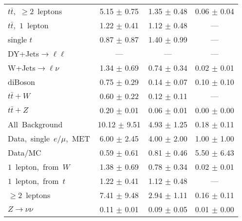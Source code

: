 \documentclass{article}
\begin{document}
\begin{longtable}{|l|c|c|c|}
$t\bar{t}$,~$\ge2$~leptons & 5.15 $\pm$ 0.75  & 1.35 $\pm$ 0.48  & 0.06 $\pm$ 0.04 \\* 
$t\bar{t}$,~$1$~lepton & 1.22 $\pm$ 0.41  & 1.12 $\pm$ 0.48  & --- \\* 
single $t$  & 0.87 $\pm$ 0.87  & 1.40 $\pm$ 0.99  & --- \\* 
DY+Jets$\rightarrow\ell\ell$  & ---  & ---  & --- \\* 
W+Jets$\rightarrow\ell\nu$  & 1.34 $\pm$ 0.69  & 0.74 $\pm$ 0.34  & 0.02 $\pm$ 0.01 \\* 
diBoson  & 0.75 $\pm$ 0.29  & 0.14 $\pm$ 0.07  & 0.10 $\pm$ 0.10 \\* 
$t\bar{t}+W$  & 0.60 $\pm$ 0.22  & 0.12 $\pm$ 0.11  & --- \\* 
$t\bar{t}+Z$  & 0.20 $\pm$ 0.01  & 0.06 $\pm$ 0.01  & 0.00 $\pm$ 0.00 \\* 
\hline \hline 
All~Background  & 10.12 $\pm$ 9.51  & 4.93 $\pm$ 1.25  & 0.18 $\pm$ 0.11 \\* 
Data,~single~$e/\mu$,~MET  & 6.00 $\pm$ 2.45  & 4.00 $\pm$ 2.00  & 1.00 $\pm$ 1.00 \\* 
Data/MC  & 0.59 $\pm$ 0.61  & 0.81 $\pm$ 0.46  & 5.50 $\pm$ 6.43 \\* 
\hline \hline 
$1$~lepton,~from~$W$  & 1.38 $\pm$ 0.69  & 0.78 $\pm$ 0.34  & 0.02 $\pm$ 0.01 \\* 
$1$~lepton,~from~$t$  & 1.22 $\pm$ 0.41  & 1.12 $\pm$ 0.48  & --- \\* 
$\ge2$~leptons  & 7.41 $\pm$ 9.48  & 2.94 $\pm$ 1.11  & 0.16 $\pm$ 0.11 \\* 
$Z\rightarrow\nu\nu$  & 0.11 $\pm$ 0.01  & 0.09 $\pm$ 0.05  & 0.01 $\pm$ 0.00 \\* 
\hline 
\end{longtable} 

 
 
 
 
\pagebreak 

 
 
 
 
\end{document}
